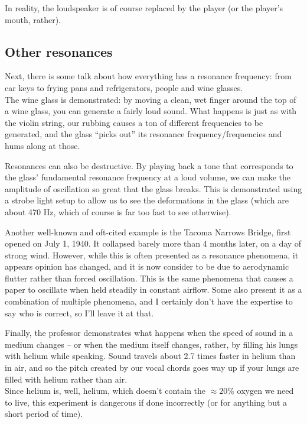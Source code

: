 In reality, the loudspeaker is of course replaced by the player (or the player's mouth, rather).

\subsection{Other resonances}

Next, there is some talk about how everything has a resonance frequency: from car keys to frying pans and refrigerators, people and wine glasses.\\
The wine glass is demonstrated: by moving a clean, wet finger around the top of a wine glass, you can generate a fairly loud sound. What happens is just as with the violin string, our rubbing causes a ton of different frequencies to be generated, and the glass ``picks out'' its resonance frequency/frequencies and hums along at those.

Resonances can also be destructive. By playing back a tone that corresponds to the glass' fundamental resonance frequency at a loud volume, we can make the amplitude of oscillation so great that the glass breaks. This is demonstrated using a strobe light setup to allow us to see the deformations in the glass (which are about 470 Hz, which of course is far too fast to see otherwise).

Another well-known and oft-cited example is the Tacoma Narrows Bridge, first opened on July 1, 1940. It collapsed barely more than 4 months later, on a day of strong wind. However, while this is often presented as a resonance phenomena, it appears opinion has changed, and it is now consider to be due to aerodynamic flutter rather than forced oscillation. This is the same phenomena that causes a paper to oscillate when held steadily in constant airflow. Some also present it as a combination of multiple phenomena, and I certainly don't have the expertise to say who is correct, so I'll leave it at that.

Finally, the professor demonstrates what happens when the speed of sound in a medium changes -- or when the medium itself changes, rather, by filling his lungs with helium while speaking. Sound travels about 2.7 times faster in helium than in air, and so the pitch created by our vocal chords goes way up if your lungs are filled with helium rather than air.\\
Since helium is, well, helium, which doesn't contain the $\approx 20$\% oxygen we need to live, this experiment is dangerous if done incorrectly (or for anything but a short period of time).

